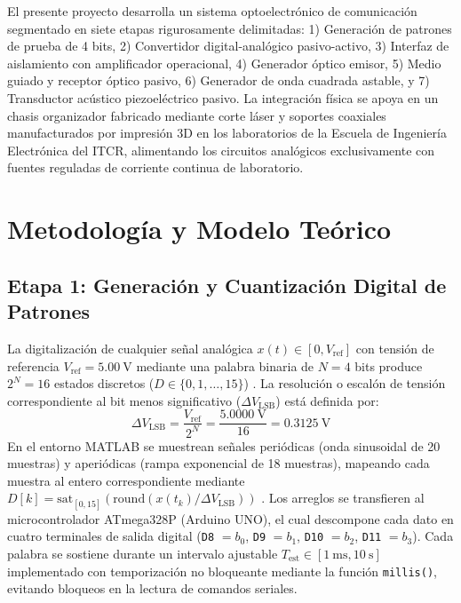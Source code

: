 \documentclass[journal,transmag]{IEEEtran}
\begin{document}
El presente proyecto desarrolla un sistema optoelectrónico de comunicación segmentado en siete etapas rigurosamente delimitadas: 1) Generación de patrones de prueba de 4 bits, 2) Convertidor digital-analógico pasivo-activo, 3) Interfaz de aislamiento con amplificador operacional, 4) Generador óptico emisor, 5) Medio guiado y receptor óptico pasivo, 6) Generador de onda cuadrada astable, y 7) Transductor acústico piezoeléctrico pasivo. La integración física se apoya en un chasis organizador fabricado mediante corte láser y soportes coaxiales manufacturados por impresión 3D en los laboratorios de la Escuela de Ingeniería Electrónica del ITCR, alimentando los circuitos analógicos exclusivamente con fuentes reguladas de corriente continua de laboratorio.

\section{Metodología y Modelo Teórico}

\subsection{Etapa 1: Generación y Cuantización Digital de Patrones}
La digitalización de cualquier señal analógica $x(t) \in [0, V_{\text{ref}}]$ con tensión de referencia $V_{\text{ref}} = \SI{5.00}{\volt}$ mediante una palabra binaria de $N = 4$ bits produce $2^N = 16$ estados discretos ($D \in \{0, 1, \dots, 15\}$) \cite{proakis2007}. La resolución o escalón de tensión correspondiente al bit menos significativo ($\Delta V_{\text{LSB}}$) está definida por:
\begin{equation}
\Delta V_{\text{LSB}} = \frac{V_{\text{ref}}}{2^N} = \frac{\SI{5.0000}{\volt}}{16} = \SI{0.3125}{\volt}
\label{eq:lsb}
\end{equation}
En el entorno MATLAB se muestrean señales periódicas (onda sinusoidal de 20 muestras) y aperiódicas (rampa exponencial de 18 muestras), mapeando cada muestra al entero correspondiente mediante $D[k] = \text{sat}_{[0,15]}(\text{round}(x(t_k)/\Delta V_{\text{LSB}}))$ \cite{proakis2007}. Los arreglos se transfieren al microcontrolador ATmega328P (Arduino UNO), el cual descompone cada dato en cuatro terminales de salida digital (\texttt{D8} $= b_0$, \texttt{D9} $= b_1$, \texttt{D10} $= b_2$, \texttt{D11} $= b_3$). Cada palabra se sostiene durante un intervalo ajustable $T_{\text{est}} \in [\SI{1}{\milli\second}, \SI{10}{\second}]$ implementado con temporización no bloqueante mediante la función \texttt{millis()}, evitando bloqueos en la lectura de comandos seriales.
\end{document}
